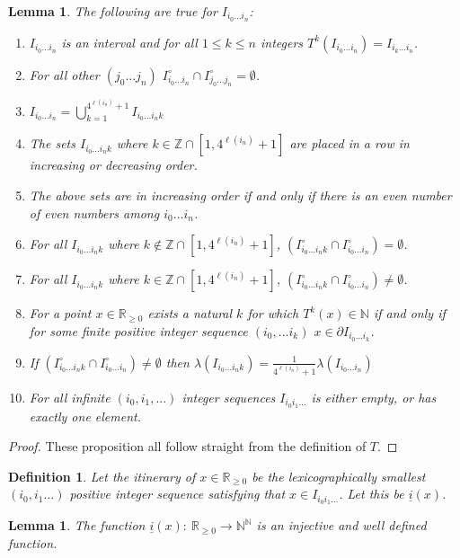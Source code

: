 \documentclass{article}
\newtheorem{lemma}[theorem]{Lemma}
\newtheorem{defin}[theorem]{Definition}
\begin{document}
\begin{lemma}\label{Rendszer}
The following are true for $I_{i_0...i_n}$:
\begin{enumerate}
\item $I_{i_0...i_n}$ is an interval and for all $1 \leq k\leq n$ integers $T^k(I_{i_0...i_n}) = I_{i_k...i_n}$.
\item For all other $(j_0...j_n)$ $I_{i_0...i_n}^\circ \cap I_{j_0...j_n}^\circ = \emptyset$.
\item $I_{i_0...i_n} = \bigcup_{k=1}^{4^{\ell(i_n)}+1} I_{i_0...i_nk}$
\item The sets $I_{i_0...i_nk}$ where $k \in \mathbb{Z} \cap [1,4^{\ell(i_n)}+1]$ are placed in a row in increasing or decreasing order.
\item The above sets are in increasing order if and only if there is an even number of even numbers among $i_0 ... i_n$.
\item For all $I_{i_0...i_nk}$ where $k \notin \mathbb{Z} \cap [1,4^{\ell(i_n)}+1]$, $( I_{i_0...i_nk}^\circ \cap I_{i_0...i_n}^\circ ) = \emptyset$.
\item For all $I_{i_0...i_nk}$ where $k \in \mathbb{Z} \cap [1,4^{\ell(i_n)}+1]$, $( I_{i_0...i_nk}^\circ \cap I_{i_0...i_n}^\circ ) \neq \emptyset$.
\item For a point $x \in \mathbb{R}_{\geq 0}$ exists a natural $k$ for which $T^k(x)\in \mathbb{N}$ if and only if for some finite positive integer sequence $(i_0,...i_k)$ $x \in \partial I_{i_0...i_k}$.
\item If $( I_{i_0...i_nk}^\circ \cap I_{i_0...i_n}^\circ ) \neq \emptyset$ then $\lambda(I_{i_0...i_nk}) = \frac{1}{4^{\ell(i_n)}+1} \lambda(I_{i_0...i_n})$
\item For all infinite $(i_0, i_1, ...)$ integer sequences $I_{i_0i_1...}$ is either empty, or has exactly one element.
\end{enumerate}
\end{lemma}

\begin{proof}
These proposition all follow straight from the definition of $T$.
\end{proof}

\begin{defin}
Let the itinerary of $x\in \mathbb{R}_{\geq0}$ be the lexicographically smallest $(i_0, i_1 ...)$ positive integer sequence satisfying that $x \in I_{i_0i_1...}$. Let this be $\underline{i}(x)$.
\end{defin}

\begin{lemma}
The function $\underline{i}(x): \: \mathbb{R}_{\geq 0} \rightarrow \mathbb{N}^ \mathbb{N}$ is an injective and well defined function.
\end{lemma}
\end{document}
